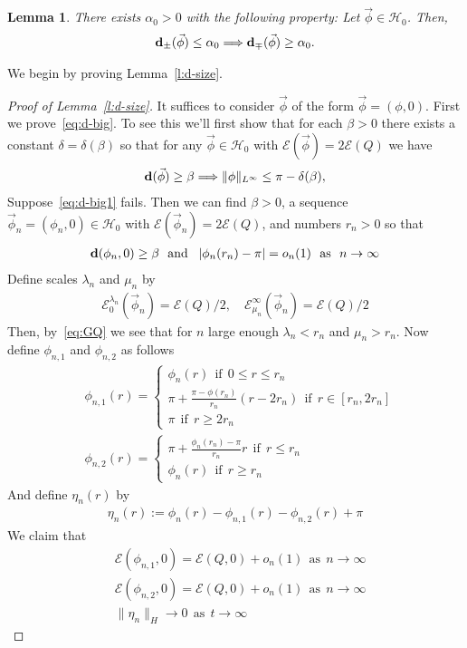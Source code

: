 \documentclass[10pt,reqno]{amsart}
\newcommand{\E}{\mathcal{E}}
\newcommand{\HH}{\mathcal{H}}
\newcommand{\al}{\alpha}
\newcommand{\be}{\beta}
\newcommand{\de}{\delta}
\newcommand{\la}{\lambda}
\newcommand{\abs}[1]{\left\lvert{#1}\right\rvert}
\newcommand{\EQ}[1]{\begin{equation}\begin{split} #1 \end{split}\end{equation}}
\numberwithin{equation}{section}
\newtheorem{lem}[thm]{Lemma}
\theoremstyle{remark}
\newcommand{\mand}{{\ \ \text{and} \ \  }}
\newcommand{\mif}{{\ \ \text{if} \ \ }}
\newcommand{\mas}{{\ \ \text{as} \ \ }}
\newcommand{\0}{\emptyset}
\newcommand{\bfd}{{\bf d}}
\begin{document}
 \begin{lem}\label{l:dpm} 
 There exists $\al_0>0$ with the following property: Let $\vec \phi \in \HH_0$. Then, %
 \EQ{
 \bfd_{\pm}(\vec \phi) \le \al_0 \Longrightarrow \bfd_{\mp}(\vec \phi)  \ge \al_0. 
 }
 \end{lem} 
 
 We begin by proving Lemma~\ref{l:d-size}. 
 
 \begin{proof}[Proof of Lemma~\ref{l:d-size}]
 It suffices to consider $\vec \phi$ of the form $\vec \phi = (\phi, 0)$. First we prove~\eqref{eq:d-big}. To see this we'll first show that for each $\be >0$ there exists a constant $\de = \de(\be)$ so that for any $\vec \phi \in \HH_0$ with $\E(\vec \phi) = 2\E(Q)$ we have 
 \EQ{ \label{eq:d-big1}
 \bfd(\vec \phi) \ge \be \Longrightarrow \| \phi \|_{L^\infty} \le \pi -  \de(\be),
 }
 Suppose~\eqref{eq:d-big1} fails. Then we can find $\be>0$, a sequence $\vec \phi_n = (\phi_n, 0) \in \HH_0$ with $\E(\vec \phi_n) = 2\E(Q)$, and numbers $r_n >0$ so that 
 \EQ{ \label{eq:phinpi} 
 \bfd(\phi_n, 0) \ge \be \mand \abs{ \phi_n(r_n) - \pi}  = o_n(1) \mas n \to \infty
 }
 Define scales $\la_n$ and $\mu_n$ by 
 \EQ{ \label{eq:lanmun} 
 \E_0^{\la_n} (\vec \phi_n) =  \E(Q)/2, \quad  \E_{\mu_n}^\infty(\vec \phi_n) = \E(Q)/2
 }
 Then, by~\eqref{eq:GQ} we see that for $n $ large enough $\la_n < r_n$ and $\mu_n >r_n$. 
 Now define $\phi_{n, 1}$ and $\phi_{n, 2}$ as follows 
\EQ{
&\phi_{n, 1}(r)  = \begin{cases}  \phi_n(r)  \mif 0 \le r \le  r_n  \\  \pi + \frac{ \pi - \phi(r_n )}{r_n  } (r - 2r_n) \mif  r \in [r_n, 2r_n] \\  \pi \mif r \ge 2r_n\end{cases}  
\\
&  \phi_{n, 2}( r)  = \begin{cases}  \pi + \frac{\phi_{n}(r_n )- \pi}{ r_n } r  \mif r \le r_n  \\ \phi_n( r)  \mif r \ge  r_n   \end{cases}
 }
 And define $\eta_n(r)$ by 
 \EQ{
  \eta_n( r)  :=  \phi_n( r) - \phi_{n, 1}( r) - \phi_{n, 2}( r) + \pi
 }
 We claim that 
 \begin{align}
 &\E( \phi_{n, 1}, 0) = \E(Q, 0) + o_n(1) \mas n \to \infty \label{eq:phi1en} \\
 &\E(\phi_{n, 2}, 0) = \E(Q, 0) + o_n(1) \mas n \to \infty  \label{eq:phi2en}\\
 &\| \eta_n\|_{H} \to 0 \mas t \to \infty \label{tieta1} 

\end{align}
\end{proof}
\end{document}
